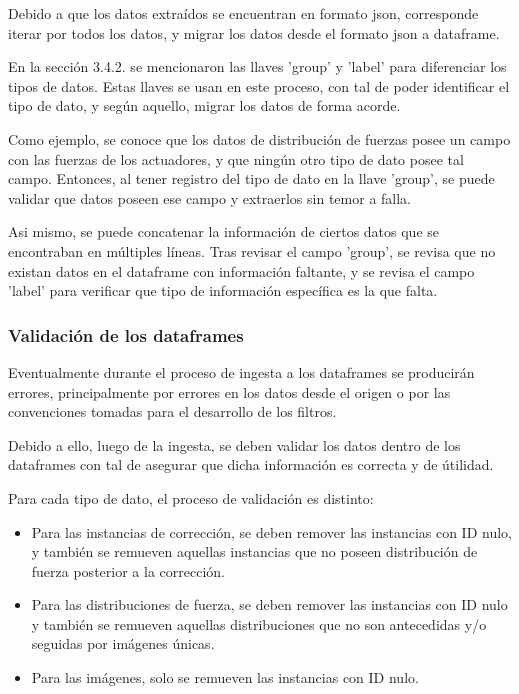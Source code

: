 Debido a que los datos extraídos se encuentran en formato json, corresponde iterar por todos los datos, y migrar los datos desde el formato json a dataframe.

En la sección 3.4.2. se mencionaron las llaves 'group' y 'label' para diferenciar los tipos de datos. Estas llaves se usan en este proceso, con tal de poder identificar el tipo de dato, y según aquello, migrar los datos de forma acorde.

Como ejemplo, se conoce que los datos de distribución de fuerzas posee un campo con las fuerzas de los actuadores, y que ningún otro tipo de dato posee tal campo. Entonces, al tener registro del tipo de dato en la llave 'group', se puede validar que datos poseen ese campo y extraerlos sin temor a falla.

Asi mismo, se puede concatenar la información de ciertos datos que se encontraban en múltiples líneas. Tras revisar el campo 'group', se revisa que no existan datos en el dataframe con información faltante, y se revisa el campo 'label' para verificar que tipo de información específica es la que falta.

\subsubsection{Validación de los dataframes}

Eventualmente durante el proceso de ingesta a los dataframes se producirán errores, principalmente por errores en los datos desde el origen o por las convenciones tomadas para el desarrollo de los filtros.

Debido a ello, luego de la ingesta, se deben validar los datos dentro de los dataframes con tal de asegurar que dicha información es correcta y de útilidad.

Para cada tipo de dato, el proceso de validación es distinto:

\begin{itemize}
    \item Para las instancias de corrección, se deben remover las instancias con ID nulo, y también se remueven aquellas instancias que no poseen distribución de fuerza posterior a la corrección.

    \item Para las distribuciones de fuerza, se deben remover las instancias con ID nulo y también se remueven aquellas distribuciones que no son antecedidas y/o seguidas por imágenes únicas.

    \item Para las imágenes, solo se remueven las instancias con ID nulo.
\end{itemize}

